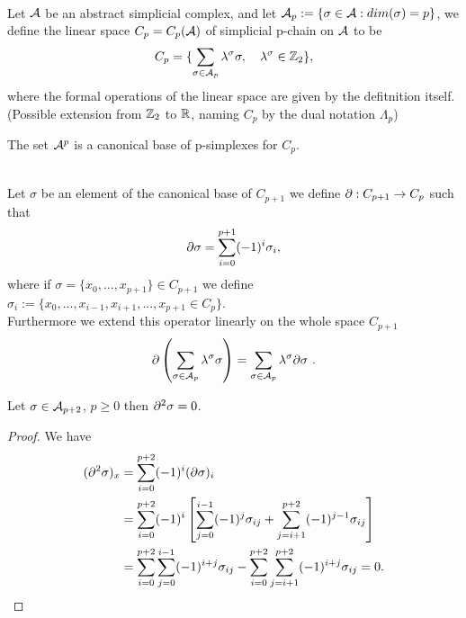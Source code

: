 \documentclass[../1.tex]{subfiles}
\begin{document}
    \begin{defn}
        \\
        Let $\mathcal{A}$ be an abstract simplicial complex, and let $\mathcal{A}_p := \{\sigma \in \mathcal{A} : dim(\sigma) = p\}$, 
        we define the linear space $C_p = C_p(\mathcal{A})$ of simplicial p-chain on $\mathcal{A}$ to be 
        \[ C_p = \{ \sum_{\sigma \in \mathcal{A}_p} \lambda^\sigma \sigma ,\quad \lambda^\sigma \in \mathbb{Z}_2\}, \]
        where the formal operations of the linear space are given by the defitnition itself.\\
        (Possible extension from $\mathbb{Z}_2$ to $\mathbb{R}$, naming $C_p$ by the dual notation $\Lambda_p$)
    \end{defn}
    The set $\mathcal{A}^p$ is a canonical base of p-simplexes for $C_p$.\\
    \begin{defn}
        \\
        Let $\sigma$ be an element of the canonical base of $C_{p+1}$ we define $\partial : C_{p+1} \to C_p$ such that
        \[ \partial \sigma = \sum_{i = 0}^{p+1} (-1)^i \sigma_i, \]
        where if $ \sigma = \{x_0, ..., x_{p+1}\} \in C_{p+1}$ we define $\sigma_i := \{x_0, ..., x_{i-1},x_{i+1}, ..., x_{p+1} \in C_p\}$.\\
        Furthermore we extend this operator linearly on the whole space $C_{p+1}$
        \[ \partial \left( \sum_{\sigma \in \mathcal{A}_p} \lambda^\sigma \sigma \right) = \sum_{\sigma \in \mathcal{A}_p} \lambda^\sigma \partial \sigma \ .\]
    \end{defn}
    \begin{lem}
        Let $\sigma \in \mathcal{A}_{p+2}$, $p \geq 0$ then $\partial^2 \sigma = 0$.
    \end{lem}
    \begin{proof}
        We have \\
        \begin{equation*}
            \begin{aligned}
                (\partial^2 \sigma)_x &= \sum_{i = 0}^{p+2} (-1)^i (\partial \sigma)_i \\
                &= \sum_{i = 0}^{p+2} (-1)^i \left[ \sum_{j = 0}^{i-1}(-1)^j \sigma_{ij} + 
                \sum_{j = i+1}^{p+2} (-1)^{j-1} \sigma_{ij} \right]\\
                &= \sum_{i = 0}^{p+2} \sum_{j = 0}^{i-1} (-1)^{i+j} \sigma_{ij} -
                \sum_{i = 0}^{p+2} \sum_{j = i+1}^{p+2} (-1)^{i+j} \sigma_{ij} = 0.
            \end{aligned}
        \end{equation*}
    \end{proof}
\end{document}
